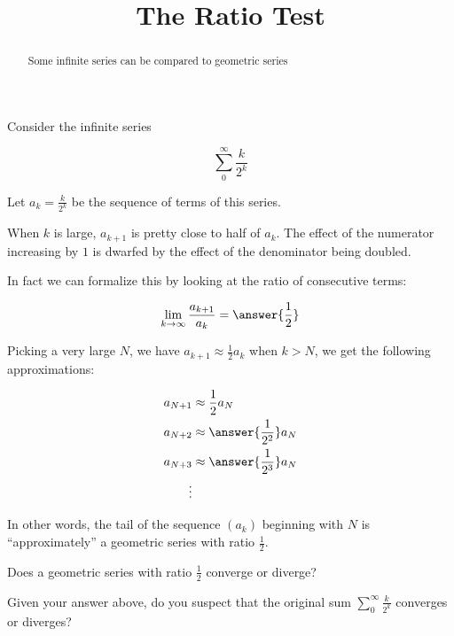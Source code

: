 \documentclass{ximera}
\title[Dig-In:]{The Ratio Test}
\begin{document}
\begin{abstract}
Some infinite series can be compared to geometric series
\end{abstract}
\maketitle

\begin{exploration}
Consider the infinite series

\[
\sum_0^\infty \frac{k}{2^k}
\]

Let $a_k = \frac{k}{2^k}$ be the sequence of terms of this series.

When $k$ is large, $a_{k+1}$ is pretty close to half of $a_{k}$.  The effect of the numerator increasing by $1$ is dwarfed by the effect of the denominator being doubled.

In fact we can formalize this by looking at the ratio of consecutive terms:

\[
\lim_{k \to \infty} \frac{a_{k+1}}{a_k} = \answer{\frac{1}{2}}
\]

Picking a very large $N$, we have $a_{k+1} \approx \frac{1}{2}a_k$ when $k>N$, we get the following approximations:

\begin{align*}
a_{N+1} &\approx \frac{1}{2} a_N\\
a_{N+2} &\approx \answer{\frac{1}{2^2}} a_N\\
a_{N+3} &\approx \answer{\frac{1}{2^3}} a_N\\
\vdots
\end{align*}

In other words, the tail of the sequence $(a_k)$ beginning with $N$ is ``approximately'' a geometric series with ratio $\frac{1}{2}$.

Does a geometric series with ratio $\frac{1}{2}$ converge or diverge?

\begin{multipleChoice}
\end{multipleChoice}
 
 Given your answer above, do you suspect that the original sum $\sum_0^\infty \frac{k}{2^k}$ converges or diverges?
 
 \begin{multipleChoice}
\end{multipleChoice}
 
\end{exploration}
\end{document}
